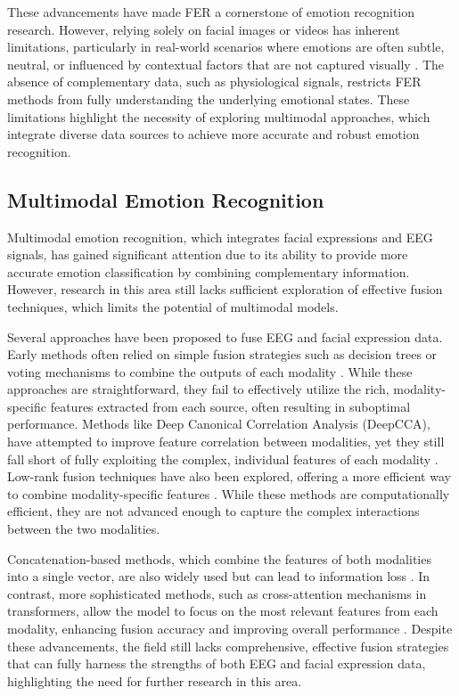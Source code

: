 These advancements have made FER a cornerstone of emotion recognition research. However, relying solely on facial images or videos has inherent limitations, particularly in real-world scenarios where emotions are often subtle, neutral, or influenced by contextual factors that are not captured visually \cite{facialReview}. The absence of complementary data, such as physiological signals, restricts FER methods from fully understanding the underlying emotional states. These limitations highlight the necessity of exploring multimodal approaches, which integrate diverse data sources to achieve more accurate and robust emotion recognition.

\subsection{Multimodal Emotion Recognition}
Multimodal emotion recognition, which integrates facial expressions and EEG signals, has gained significant attention due to its ability to provide more accurate emotion classification by combining complementary information. However, research in this area still lacks sufficient exploration of effective fusion techniques, which limits the potential of multimodal models.

Several approaches have been proposed to fuse EEG and facial expression data. Early methods often relied on simple fusion strategies such as decision trees or voting mechanisms to combine the outputs of each modality \cite{tan2021multimodal,startingArticle}. While these approaches are straightforward, they fail to effectively utilize the rich, modality-specific features extracted from each source, often resulting in suboptimal performance. Methods like Deep Canonical Correlation Analysis (DeepCCA), have attempted to improve feature correlation between modalities, yet they still fall short of fully exploiting the complex, individual features of each modality \cite{muhammad2023bimodal}. Low-rank fusion techniques have also been explored, offering a more efficient way to combine modality-specific features \cite{liu2018efficient}. While these methods are computationally efficient, they are not advanced enough to capture the complex interactions between the two modalities.

Concatenation-based methods, which combine the features of both modalities into a single vector, are also widely used but can lead to information loss \cite{jung2019utilizing,greatHelp,huangEnhance}. In contrast, more sophisticated methods, such as cross-attention mechanisms in transformers, allow the model to focus on the most relevant features from each modality, enhancing fusion accuracy and improving overall performance \cite{husformer}. Despite these advancements, the field still lacks comprehensive, effective fusion strategies that can fully harness the strengths of both EEG and facial expression data, highlighting the need for further research in this area.

